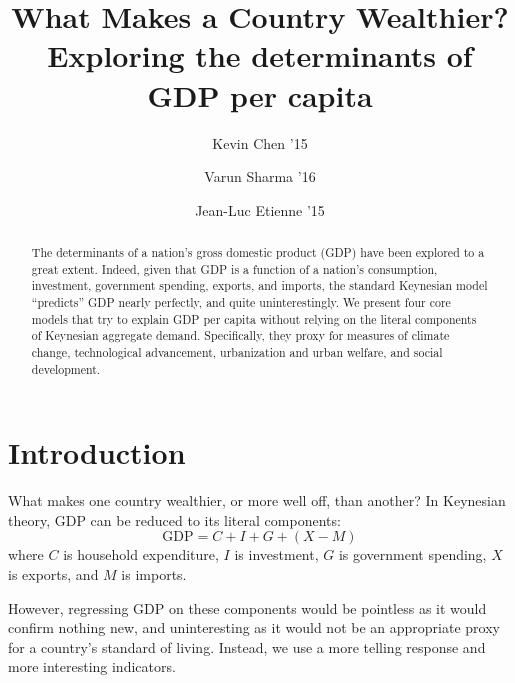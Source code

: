 \documentclass[11pt]{article}
\title{
  \sc
  What Makes a Country Wealthier? \\
  {\large Exploring the determinants of GDP per capita}
}
\author{
    {\rm Kevin Chen '15} \\ 
    \and
    {\rm Varun Sharma '16} \\ 
    \and
    {\rm Jean-Luc Etienne '15} \\ 
}
\begin{document}
\date{}
\maketitle
\doublespacing


\begin{abstract}
The determinants of a nation's gross domestic product (GDP) have been explored to a great extent. Indeed, given that GDP is a function of a nation's consumption, investment, government spending, exports, and imports, the standard Keynesian model ``predicts'' GDP nearly perfectly, and quite uninterestingly. We present four core models that try to explain GDP per capita without relying on the literal components of Keynesian aggregate demand. Specifically, they proxy for measures of climate change, technological advancement, urbanization and urban welfare, and social development.
\end{abstract}

\newpage








\section{Introduction}
What makes one country wealthier, or more well off, than another? In Keynesian theory, GDP can be reduced to its literal components:
$$\mathrm{GDP} = C + I + G + (X - M)$$
where $C$ is household expenditure, $I$ is investment,  $G$ is government spending, $X$ is exports, and $M$ is imports.

However, regressing GDP on these components would be pointless as it would confirm nothing new, and uninteresting as it would not be an appropriate proxy for a country's standard of living. Instead, we use a more telling response and more interesting indicators.
\end{document}
